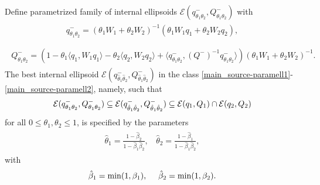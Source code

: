 \documentclass[letterpaper,10pt,english]{sphinxmanual}
\begin{document}
Define parametrized family of internal ellipsoids
${\mathcal E}(q^-_{\theta_1\theta_2},Q^-_{\theta_1\theta_2})$ with
\label{main_source:equation-paramell1}\begin{gather}
\begin{split}q^-_{\theta_1\theta_2}  =  (\theta_1W_1 +
\theta_2W_2)^{-1}(\theta_1W_1q_1 + \theta_2W_2q_2),\\\end{split}\label{main_source-paramell1}
\end{gather}\label{main_source:equation-paramell2}\begin{gather}
\begin{split}Q^-_{\theta_1\theta_2} =  (1 - \theta_1\langle q_1,W_1q_1\rangle -
\theta_2\langle q_2,W_2q_2\rangle +
\langle q^-_{\theta_1\theta_2},(Q^-)^{-1}q^-_{\theta_1\theta_2}\rangle)
(\theta_1W_1 + \theta_2W_2)^{-1} .\end{split}\label{main_source-paramell2}
\end{gather}
The best internal ellipsoid
${\mathcal E}(q^-_{\hat{\theta}_1\hat{\theta}_2},Q^-_{\hat{\theta}_1\hat{\theta}_2})$
in the class \eqref{main_source-paramell1}-\eqref{main_source-paramell2}, namely, such that
\begin{gather}
\begin{split}{\mathcal E}(q^-_{{\theta}_1{\theta}_2},Q^-_{{\theta}_1{\theta}_2})\subseteq
{\mathcal E}(q^-_{\hat{\theta}_1\hat{\theta}_2},Q^-_{\hat{\theta}_1\hat{\theta}_2})
\subseteq {\mathcal E}(q_1,Q_1)\cap{\mathcal E}(q_2,Q_2)\end{split}\notag
\end{gather}
for all $0\leqslant\theta_1,\theta_2\leqslant1$, is specified by
the parameters
\label{main_source:equation-thetapar}\begin{gather}
\begin{split}\hat{\theta}_1 = \frac{1-\hat{\beta}_2}{1-\hat{\beta}_1\hat{\beta}_2}, ~~~~
\hat{\theta}_2 = \frac{1-\hat{\beta}_1}{1-\hat{\beta}_1\hat{\beta}_2},\end{split}\label{main_source-thetapar}
\end{gather}
with
\begin{gather}
\begin{split}\hat{\beta}_1=\min(1,\beta_1), ~~~~ \hat{\beta}_2=\min(1,\beta_2).\end{split}\notag\\\begin{split}\end{split}\notag
\end{gather}
\end{document}
